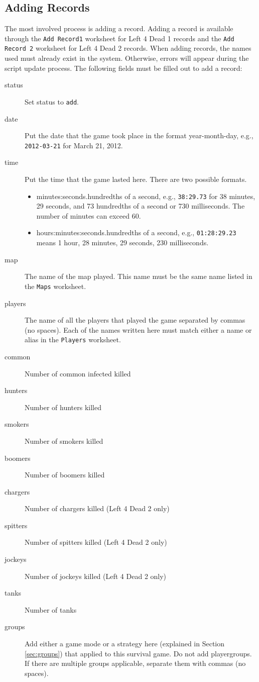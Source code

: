 \subsection{Adding Records}
The most involved process is adding a record. Adding a record is available through the \texttt{Add Record1} worksheet for Left 4 Dead 1 records and the \texttt{Add Record 2} worksheet for Left 4 Dead 2 records. When adding records, the names used must already exist in the system. Otherwise, errors will appear during the script update process. The following fields must be filled out to add a record:
\begin{description}
\item[status] Set status to \texttt{add}.
\item[date] Put the date that the game took place in the format year-month-day, e.g., \texttt{2012-03-21} for March 21, 2012.
\item[time] Put the time that the game lasted here. There are two possible formats.
	\begin{itemize}
	\item minutes:seconds.hundredths of a second, e.g., \texttt{38:29.73} for 38 minutes, 29 seconds, and 73 hundredths of a second or 730 milliseconds. The number of minutes can exceed 60.
	\item hours:minutes:seconds.hundredths of a second, e.g., \texttt{01:28:29.23} means 1 hour, 28 minutes, 29 seconds, 230 milliseconds.
	\end{itemize}
\item[map] The name of the map played. This name must be the same name listed in the \texttt{Maps} worksheet.
\item[players] The name of all the players that played the game separated by commas (no spaces). Each of the names written here must match either a name or alias in the \texttt{Players} worksheet.
\item[common] Number of common infected killed
\item[hunters] Number of hunters killed
\item[smokers] Number of smokers killed
\item[boomers] Number of boomers killed
\item[chargers] Number of chargers killed (Left 4 Dead 2 only)
\item[spitters] Number of spitters killed (Left 4 Dead 2 only)
\item[jockeys] Number of jockeys killed (Left 4 Dead 2 only)
\item[tanks] Number of tanks
\item[groups] Add either a game mode or a strategy here (explained in Section \ref{sec:groups}) that applied to this survival game. Do not add playergroups. If there are multiple groups applicable, separate them with commas (no spaces).
\end{description}

